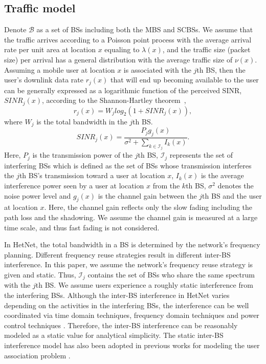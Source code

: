 \documentclass[journal]{IEEEtran}
\theoremstyle{definition}
\begin{document}
\subsection{Traffic model}
Denote $\mathcal{B}$ as a set of BSs including both the MBS and SCBSs. We assume that the traffic arrives according to a Poisson point process with the average arrival rate per unit area at location $x$ equaling to $\lambda(x)$, and the traffic size (packet size) per arrival has a general distribution with the average traffic size of $\nu(x)$. Assuming a mobile user at location $x$ is associated with the $j$th BS, then the user's downlink data rate $r_{j}(x)$ that will end up becoming available to the user can be generally expressed as a logarithmic function of the perceived SINR, $SINR_{j}(x)$, according to the Shannon-Hartley theorem~\cite{Kim:2012:DOU},
\begin{equation}
\label{eq:user_rate}
r_{j}(x)=W_{j}log_{2}(1+SINR_{j}(x)),
\end{equation}
where $W_{j}$ is the total bandwidth in the $j$th BS.
\begin{equation}
\label{eq:user_SINR}
SINR_{j}(x)=\frac{P_{j}g_{j}(x)}{\sigma^{2}+\sum_{k \in \mathcal{I}_{j}}I_{k}(x)}.
\end{equation}
Here, $P_{j}$ is the transmission power of the $j$th BS, $\mathcal{I}_{j}$ represents the set of interfering BSs which is defined as the set of BSs whose transmission interferes the $j$th BS's transmission toward a user at location $x$, $I_{k}(x)$ is the average interference power seen by a user at location $x$ from the $k$th BS, $\sigma^{2}$ denotes the noise power level and $g_{j}(x)$ is the channel gain between the $j$th BS and the user at location $x$. Here, the channel gain reflects only the slow fading including the path loss and the shadowing. We assume the channel gain is measured at a large time scale, and thus fast fading is not considered.

In HetNet, the total bandwidth in a BS is determined by the network's frequency planning. Different frequency reuse strategies result in different inter-BS interference. In this paper, we assume the network's frequency reuse strategy is given and static. Thus, $\mathcal{I}_{j}$ contains the set of BSs who share the same spectrum with the $j$th BS. We assume users experience a roughly static interference from the interfering BSs. Although the inter-BS interference in HetNet varies depending on the activities in the interfering BSs, the interference can be well coordinated via time domain techniques, frequency domain techniques and power control techniques \cite{Lopez:2011:EICIC}. Therefore, the inter-BS interference can be reasonably modeled as a static value for analytical simplicity. The static inter-BS interference model has also been adopted in previous works for modeling the user association problem \cite{Son:2009:DAL, Kim:2012:DOU}.
\end{document}
